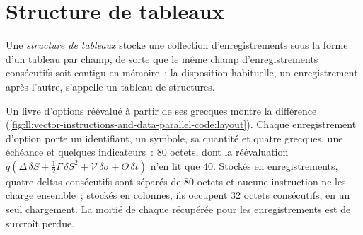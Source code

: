 \section{Structure de tableaux}

\begin{definition}\label{def:ll:vector-instructions-and-data-parallel-code:soa}
Une \emph{structure de tableaux} stocke une collection d'enregistrements sous la forme d'un tableau par champ, de sorte que le
même champ d'enregistrements consécutifs soit contigu en mémoire~; la disposition habituelle, un enregistrement après l'autre, s'appelle un
tableau de structures.
\end{definition}

Un livre d'options réévalué à partir de ses grecques montre la différence
(\cref{fig:ll:vector-instructions-and-data-parallel-code:layout}). Chaque enregistrement d'option porte un identifiant, un symbole, sa
quantité et quatre grecques, une échéance et quelques indicateurs~: 80 octets, dont la réévaluation $q(\Delta\,\delta S + \tfrac12
\Gamma\,\delta S^2 + \mathcal{V}\,\delta\sigma + \Theta\,\delta t)$ n'en lit que 40. Stockés en enregistrements, quatre deltas consécutifs sont
séparés de 80 octets et aucune instruction ne les charge ensemble~; stockés en colonnes, ils occupent 32 octets consécutifs, en un seul chargement. La moitié de
chaque  récupérée pour les enregistrements est de surcroît perdue.

